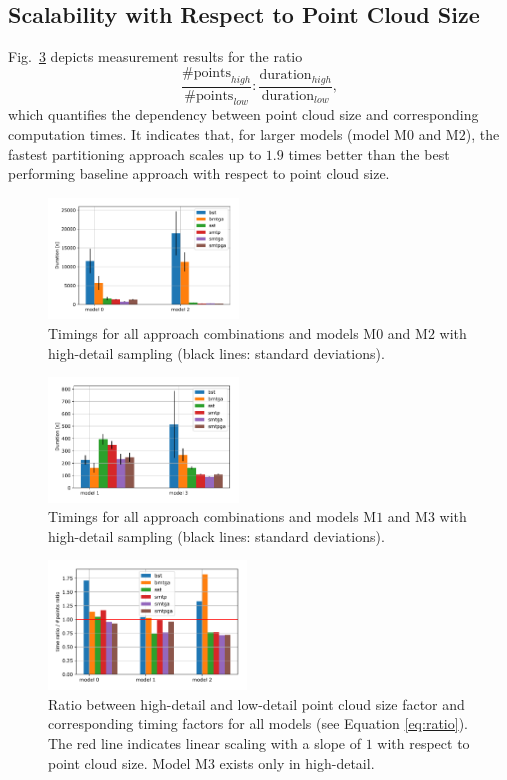 \subsection{Scalability with Respect to Point Cloud Size}  
Fig.~\ref{fig:graph3} depicts measurement results for the ratio
\begin{equation} \label{eq:ratio}
\frac{\#\text{points}_{high}}{\#\text{points}_{low}} : \frac{\text{duration}_{high}}{\text{duration}_{low}}, 
\end{equation}
which quantifies the dependency between point cloud size and corresponding computation times.
It indicates that, for larger models (model M$0$ and M$2$), the fastest partitioning approach scales up to $1.9$ times better than the best performing baseline approach with respect to point cloud size.
\begin{figure}[htb]
	\centering
	\includegraphics[width=0.45\textwidth]{figures/g1.pdf}
	\caption{Timings for all approach combinations and models M$0$ and M$2$ with high-detail sampling (black lines: standard deviations).}
	\label{fig:graph1}
\end{figure}
\begin{figure}[htb]
	\centering
	\includegraphics[width=0.45\textwidth]{figures/g4.pdf}
	\caption{Timings for all approach combinations and models M$1$ and M$3$ with high-detail sampling (black lines: standard deviations).}
	\label{fig:graph4}
\end{figure}
\begin{figure}[htb]
	\centering
	\includegraphics[width=0.47\textwidth]{figures/g3.pdf}
	\caption{Ratio between high-detail and low-detail point cloud size factor and corresponding timing factors for all models (see Equation \ref{eq:ratio}). The red line indicates linear scaling with a slope of $1$ with respect to point cloud size. Model M$3$ exists only in high-detail.}
	\label{fig:graph3}
\end{figure}
